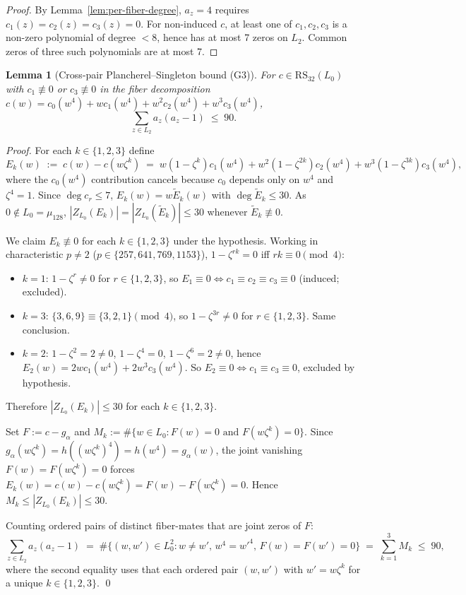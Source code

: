 \documentclass[11pt]{article}
\newtheorem{lemma}[theorem]{Lemma}
\theoremstyle{definition}
\theoremstyle{remark}
\begin{document}
\begin{proof}
By Lemma~\ref{lem:per-fiber-degree}, $a_z = 4$ requires
$c_1(z) = c_2(z) = c_3(z) = 0$. For non-induced $c$, at least one of
$c_1, c_2, c_3$ is a non-zero polynomial of degree $< 8$, hence has at
most 7 zeros on $L_2$. Common zeros of three such polynomials are at
most 7.
\end{proof}

\begin{lemma}[Cross-pair Plancherel--Singleton bound (G3)]
\label{lem:cross-pair-singleton}
For $c \in \mathrm{RS}_{32}(L_0)$ with $c_1 \not\equiv 0$ or
$c_3 \not\equiv 0$ in the fiber decomposition $c(w) = c_0(w^4) + w c_1(w^4)
+ w^2 c_2(w^4) + w^3 c_3(w^4)$,
\[
  \sum_{z \in L_2} a_z(a_z - 1) \;\leq\; 90.
\]
\end{lemma}

\begin{proof}
For each $k \in \{1, 2, 3\}$ define
\[
E_k(w) \;:=\; c(w) - c(w\zeta^k)
\;=\; w(1 - \zeta^k) c_1(w^4)
   + w^2 (1 - \zeta^{2k}) c_2(w^4)
   + w^3 (1 - \zeta^{3k}) c_3(w^4),
\]
where the $c_0(w^4)$ contribution cancels because $c_0$ depends only on
$w^4$ and $\zeta^4 = 1$. Since $\deg c_r \leq 7$, $E_k(w) = w \tilde E_k(w)$
with $\deg \tilde E_k \leq 30$. As $0 \notin L_0 = \mu_{128}$,
$|Z_{L_0}(E_k)| = |Z_{L_0}(\tilde E_k)| \leq 30$ whenever $\tilde E_k
\not\equiv 0$.

We claim $E_k \not\equiv 0$ for each $k \in \{1, 2, 3\}$ under the hypothesis.
Working in characteristic $p \neq 2$ ($p \in \{257, 641, 769, 1153\}$),
$1 - \zeta^{rk} = 0$ iff $rk \equiv 0 \pmod 4$:
\begin{itemize}
  \item $k = 1$: $1 - \zeta^r \neq 0$ for $r \in \{1, 2, 3\}$, so
    $E_1 \equiv 0 \iff c_1 \equiv c_2 \equiv c_3 \equiv 0$ (induced;
    excluded).
  \item $k = 3$: $\{3, 6, 9\} \equiv \{3, 2, 1\} \pmod 4$, so
    $1 - \zeta^{3r} \neq 0$ for $r \in \{1, 2, 3\}$. Same conclusion.
  \item $k = 2$: $1 - \zeta^2 = 2 \neq 0$, $1 - \zeta^4 = 0$,
    $1 - \zeta^6 = 2 \neq 0$, hence
    $E_2(w) = 2 w c_1(w^4) + 2 w^3 c_3(w^4)$. So $E_2 \equiv 0 \iff
    c_1 \equiv c_3 \equiv 0$, excluded by hypothesis.
\end{itemize}
Therefore $|Z_{L_0}(E_k)| \leq 30$ for each $k \in \{1, 2, 3\}$.

Set $F := c - g_\alpha$ and
$M_k := \#\{w \in L_0 : F(w) = 0 \text{ and } F(w\zeta^k) = 0\}$. Since
$g_\alpha(w \zeta^k) = h((w\zeta^k)^4) = h(w^4) = g_\alpha(w)$, the
joint vanishing $F(w) = F(w\zeta^k) = 0$ forces
$E_k(w) = c(w) - c(w\zeta^k) = F(w) - F(w\zeta^k) = 0$. Hence
$M_k \leq |Z_{L_0}(E_k)| \leq 30$.

Counting ordered pairs of distinct fiber-mates that are joint zeros of $F$:
\[
\sum_{z \in L_2} a_z(a_z - 1)
\;=\; \#\{(w, w') \in L_0^2 : w \neq w',\, w^4 = w'^4,\, F(w) = F(w') = 0\}
\;=\; \sum_{k=1}^{3} M_k \;\leq\; 90,
\]
where the second equality uses that each ordered pair $(w, w')$ with
$w' = w \zeta^k$ for a unique $k \in \{1, 2, 3\}$.
\qed
\end{proof}
\end{document}

